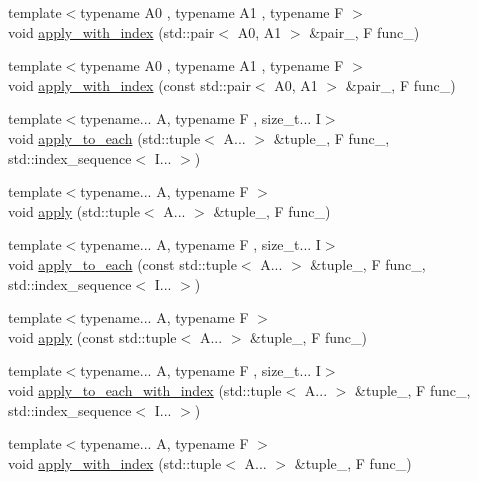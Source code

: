 \begin{DoxyCompactItemize}
\item 
{\footnotesize template$<$typename A0 , typename A1 , typename F $>$ }\\void \mbox{\hyperlink{namespacearc_1_1utl_a97b916dd6673b3b3c190b15af1719b0a}{apply\+\_\+with\+\_\+index}} (std\+::pair$<$ A0, A1 $>$ \&pair\+\_\+, F func\+\_\+)
\item 
{\footnotesize template$<$typename A0 , typename A1 , typename F $>$ }\\void \mbox{\hyperlink{namespacearc_1_1utl_ad77a0481ab72232b49349532b96f80fc}{apply\+\_\+with\+\_\+index}} (const std\+::pair$<$ A0, A1 $>$ \&pair\+\_\+, F func\+\_\+)
\item 
{\footnotesize template$<$typename... A, typename F , size\+\_\+t... I$>$ }\\void \mbox{\hyperlink{namespacearc_1_1utl_a5421e6de5c0a785ee70d9546d6ef0c41}{apply\+\_\+to\+\_\+each}} (std\+::tuple$<$ A... $>$ \&tuple\+\_\+, F func\+\_\+, std\+::index\+\_\+sequence$<$ I... $>$)
\item 
{\footnotesize template$<$typename... A, typename F $>$ }\\void \mbox{\hyperlink{namespacearc_1_1utl_af64bed0e9e6ac7220d393a1bb62f4bff}{apply}} (std\+::tuple$<$ A... $>$ \&tuple\+\_\+, F func\+\_\+)
\item 
{\footnotesize template$<$typename... A, typename F , size\+\_\+t... I$>$ }\\void \mbox{\hyperlink{namespacearc_1_1utl_acf59dac8c2f5eea5a6aa9875db3b07f8}{apply\+\_\+to\+\_\+each}} (const std\+::tuple$<$ A... $>$ \&tuple\+\_\+, F func\+\_\+, std\+::index\+\_\+sequence$<$ I... $>$)
\item 
{\footnotesize template$<$typename... A, typename F $>$ }\\void \mbox{\hyperlink{namespacearc_1_1utl_a6dadc719c6540032592f36b5c14cae27}{apply}} (const std\+::tuple$<$ A... $>$ \&tuple\+\_\+, F func\+\_\+)
\item 
{\footnotesize template$<$typename... A, typename F , size\+\_\+t... I$>$ }\\void \mbox{\hyperlink{namespacearc_1_1utl_a0bc38a64f17e53212169cae0a6eb23bb}{apply\+\_\+to\+\_\+each\+\_\+with\+\_\+index}} (std\+::tuple$<$ A... $>$ \&tuple\+\_\+, F func\+\_\+, std\+::index\+\_\+sequence$<$ I... $>$)
\item 
{\footnotesize template$<$typename... A, typename F $>$ }\\void \mbox{\hyperlink{namespacearc_1_1utl_a2658c84859917c434ff3a7f667b21eca}{apply\+\_\+with\+\_\+index}} (std\+::tuple$<$ A... $>$ \&tuple\+\_\+, F func\+\_\+)

\end{DoxyCompactItemize}
